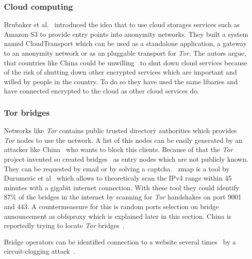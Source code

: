 \documentclass{sig-alternate}
\begin{document}
\subsubsection{Cloud computing}

Brubaker et al.~\cite{brubakercloudtransport} introduced the idea that to use cloud storages services such as Amazon S3 to provide entry points into anonymity networks. They built a system named CloudTransport which can be used as a standalone application, a gateway to an anonymity network or as an pluggable transport for \textit{Tor}. The autors argue, that countries like China could be unwilling~\cite{linkThirteen} to shut down cloud services because of the risk of shutting down other encrypted services which are important and willed by people in the country. To do so they have used the same libaries and have connected encrypted to the cloud as other cloud services do.

\subsubsection{Tor bridges}
 
Networks like \textit{Tor} contains public trusted directory authorities which provides \textit{Tor} nodes to use the network. A list of this nodes can be easily generated by an attacker like China~\cite{lewman2010china} who wants to block this clients. Because of that the \textit{Tor} project invented so created bridges~\cite{linkFourteen} as entry nodes which are not publicly known. They can be requested by email or by solving a captcha.~\cite{linkBrideProject} zmap is a tool by Durumeric et al~\cite{durumeric2013zmap} which allows to theoreticaly scan the IPv4 range within 45 minutes with a gigabit internet connection. With these tool they could identify 87\% of the bridges in the internet by scanning for \textit{Tor} handshakes on port 9001 and 443. A countermeassure for this is random ports selection on bridge announcement as obfsproxy which is explained later in this section. China is reportedly trying to locate \textit{Tor} bridges~\cite{linkKnockKnockProject, winter2012china}.
 
Bridge operators can be identified connection to a website several times~\cite{mclachlan2009risks} by a circuit-clogging attack~\cite{murdoch2005low}. 
 
\end{document}
